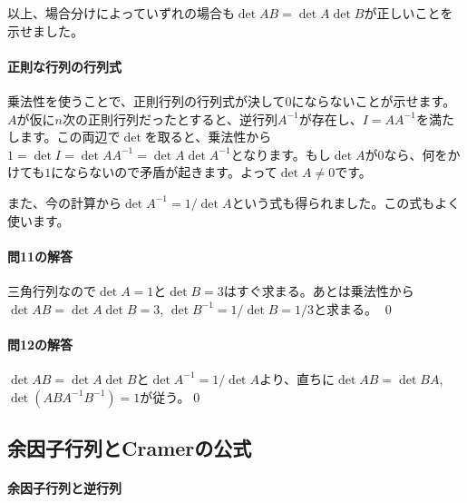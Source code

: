 以上、場合分けによっていずれの場合も$\det AB = \det A \det B$が正しいことを示せました。

\paragraph{正則な行列の行列式}

乗法性を使うことで、正則行列の行列式が決して$0$にならないことが示せます。$A$が仮に$n$次の正則行列だったとすると、逆行列$A^{-1}$が存在し、$I = AA^{-1}$を満たします。この両辺で$\det$を取ると、乗法性から$1 = \det I = \det AA^{-1} = \det A \det A^{-1}$となります。もし$\det A$が$0$なら、何をかけても$1$にならないので矛盾が起きます。よって$\det A \neq 0$です。

また、今の計算から$\det A^{-1} = 1 / \det A$という式も得られました。この式もよく使います。

\paragraph{問11の解答} 三角行列なので$\det A = 1$と$\det B = 3$はすぐ求まる。あとは乗法性から$\det AB = \det A \det B = 3$, $\det B^{-1} = 1 / \det B = 1/3$と求まる。 \qed

\paragraph{問12の解答}
$\det AB = \det A \det B$と$\det A^{-1} = 1 / \det A$より、直ちに$\det AB = \det BA$, $\det (ABA^{-1}B^{-1}) = 1$が従う。\qed

\subsection{余因子行列とCramerの公式}

\paragraph{余因子行列と逆行列}

